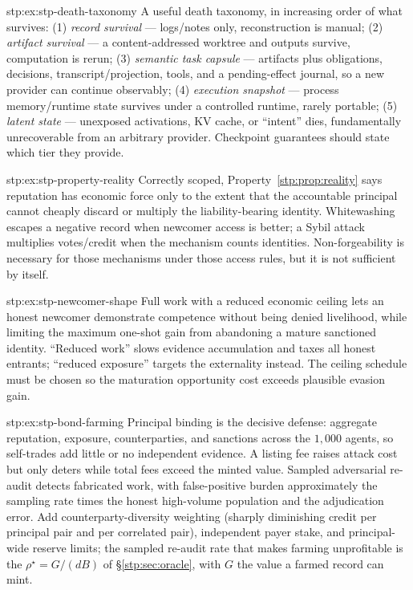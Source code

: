 \begin{pdSolution}{stp:ex:stp-death-taxonomy}
A useful death taxonomy, in increasing order of what survives: (1)
\emph{record survival} --- logs/notes only, reconstruction is manual; (2)
\emph{artifact survival} --- a content-addressed worktree and outputs survive,
computation is rerun; (3) \emph{semantic task capsule} --- artifacts plus
obligations, decisions, transcript/projection, tools, and a pending-effect
journal, so a new provider can continue observably; (4) \emph{execution
snapshot} --- process memory/runtime state survives under a controlled
runtime, rarely portable; (5) \emph{latent state} --- unexposed activations,
KV cache, or ``intent'' dies, fundamentally unrecoverable from an arbitrary
provider. Checkpoint guarantees should state which tier they provide.
\end{pdSolution}
\begin{pdSolution}{stp:ex:stp-property-reality}
Correctly scoped, Property~\ref{stp:prop:reality} says reputation has economic
force only to the extent that the accountable principal cannot cheaply
discard or multiply the liability-bearing identity. Whitewashing escapes a
negative record when newcomer access is better; a Sybil attack multiplies
votes/credit when the mechanism counts identities. Non-forgeability is
necessary for those mechanisms under those access rules, but it is not
sufficient by itself.
\end{pdSolution}
\begin{pdSolution}{stp:ex:stp-newcomer-shape}
Full work with a reduced economic ceiling lets an honest newcomer demonstrate
competence without being denied livelihood, while limiting the maximum
one-shot gain from abandoning a mature sanctioned identity. ``Reduced work''
slows evidence accumulation and taxes all honest entrants; ``reduced
exposure'' targets the externality instead. The ceiling schedule must be
chosen so the maturation opportunity cost exceeds plausible evasion gain.
\end{pdSolution}
\begin{pdSolution}{stp:ex:stp-bond-farming}
Principal binding is the decisive defense: aggregate reputation,
exposure, counterparties, and sanctions across the $1{,}000$ agents, so
self-trades add little or no independent evidence. A listing fee raises
attack cost but only deters while total fees exceed the minted value. Sampled
adversarial re-audit detects fabricated work, with false-positive burden
approximately the sampling rate times the honest high-volume population and
the adjudication error. Add counterparty-diversity weighting (sharply diminishing
credit per principal pair and per correlated pair), independent payer stake, and
principal-wide reserve limits; the sampled re-audit rate that makes farming
unprofitable is the $\rho^\star=G/(dB)$ of \S\ref{stp:sec:oracle}, with $G$ the
value a farmed record can mint.
\end{pdSolution}
